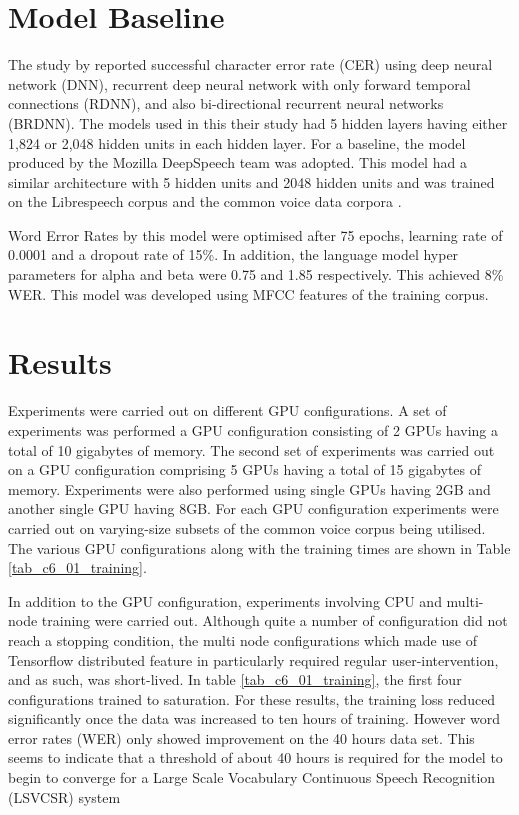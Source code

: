 \section{Model Baseline}
The study by \cite{hannun2014first} reported successful character error rate (CER)  using deep neural network (DNN), recurrent deep neural network with only forward temporal connections (RDNN), and also bi-directional recurrent neural networks (BRDNN). The models used in this their study had 5 hidden layers having either 1,824 or 2,048 hidden units in each hidden layer.  For a baseline, the model produced by the Mozilla DeepSpeech team was adopted.  This model had a similar architecture with 5 hidden units and 2048 hidden units and was trained on the Librespeech corpus and the common voice data corpora \citep{panayotov2015librispeech, mozilla/deepspeech_2019}.

Word Error Rates by this model were optimised after 75 epochs, learning rate of 0.0001 and a dropout rate of 15\%.  In addition, the language model hyper parameters for alpha and beta were 0.75 and 1.85 respectively.  This achieved 8\% WER. This model was developed using MFCC features of the training corpus.

\section{Results}
Experiments were carried out on different GPU configurations. A set of experiments was performed a GPU configuration consisting of 2 GPUs having a total of 10 gigabytes of memory. The second set of experiments was carried out on a GPU configuration comprising 5 GPUs having a total of 15 gigabytes of memory. Experiments were also performed using single GPUs having 2GB and another single GPU having 8GB.  For each GPU configuration experiments were carried out on varying-size subsets of the common voice corpus being utilised.   The various GPU configurations along with the training times are shown in Table \ref{tab_c6_01_training}.

In addition to the GPU configuration, experiments involving CPU and multi-node training were carried out.  Although quite a number of configuration did not reach a stopping condition, the multi node configurations which made use of Tensorflow distributed feature in particularly required regular user-intervention, and as such, was short-lived. In table \ref{tab_c6_01_training}, the first four configurations trained to saturation.  For these results, the training loss reduced significantly once the data was increased to ten hours of training.  However word error rates (WER) only showed improvement on the 40 hours data set.  This seems to indicate that a threshold of about 40 hours is required for the model to begin to converge for a Large Scale Vocabulary Continuous Speech Recognition (LSVCSR) system


